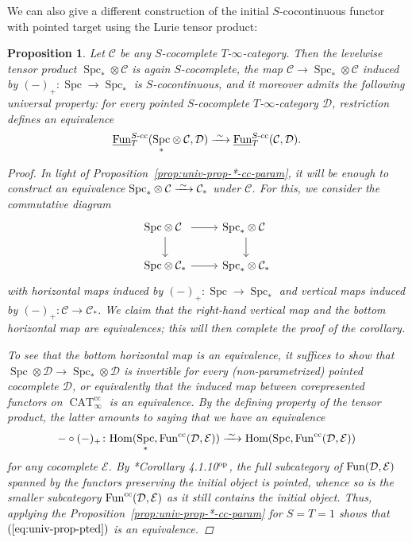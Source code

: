 \documentclass[reqno]{memo-l}
\theoremstyle{mythm}
\newtheorem{prop}[thm]{Proposition}
\theoremstyle{definition}
\numberwithin{equation}{section}
\newcommand{\Cc}{{\mathcal{C}}}
\newcommand{\Dd}{{\mathcal{D}}}
\newcommand{\Ee}{{\mathcal{E}}}
\DeclareMathOperator{\Spc}{Spc}
\DeclareMathOperator{\CAT}{CAT}
\renewcommand{\hom}{\textup{hom}}
\newcommand{\Fun}{{\textup{Fun}}}
\newcommand{\op}{{\textup{op}}}
\renewcommand{\hom}{{\textup{Hom}}}
\newcommand{\ulhelper}[2]{\underline{\setbox0=\hbox{$#1#2$}\dp0=0.4pt \box0\relax}}
\newcommand{\ul}[1]{{\mathpalette\ulhelper{#1}}\hbox{\rule[-2pt]{0pt}{0pt}}}
\newcommand{\iso}{\xrightarrow{\;\smash{\raisebox{-0.25ex}{\ensuremath{\scriptstyle\sim}}}\;}}
\begin{document}
We can also give a different construction of the initial $S$-cocontinuous functor with pointed target using the Lurie tensor product:

\begin{prop}\label{prop:Spc*-levelwise-tensor}
    Let $\Cc$ be any $S$-cocomplete $T$-$\infty$-category. Then the levelwise tensor product ${\Spc_*}\otimes\Cc$ is again $S$-cocomplete, the map $\Cc\to{\Spc_*}\otimes\Cc$ induced by $(-)_+\colon\Spc\to\Spc_*$ is $S$-cocontinuous, and it moreover admits the following universal property: for every pointed $S$-cocomplete $T$-$\infty$-category $\Dd$, restriction defines an equivalence
    \[
        \ul\Fun^\textup{$S$-cc}_T({\Spc_*}\otimes\Cc,\Dd)\iso\ul\Fun^\textup{$S$-cc}_T(\Cc,\Dd).
    \]
    \begin{proof}
        In light of Proposition~\ref{prop:univ-prop-*-cc-param}, it will be enough to construct an equivalence ${\Spc_*}\otimes\Cc\iso\Cc_*$ under $\Cc$. For this, we consider the commutative diagram
        \[
            \begin{tikzcd}
                {\Spc}\otimes\Cc_{\hphantom{*}}\arrow[d]\arrow[r] & {\Spc_*}\otimes\Cc_{\hphantom{*}}\arrow[d]\\
                {\Spc}\otimes\Cc_*\arrow[r] & {\Spc_*}\otimes\Cc_*
            \end{tikzcd}
        \]
        with horizontal maps induced by $(-)_+\colon\Spc\to\Spc_*$ and vertical maps induced by $(-)_+\colon\Cc\to\Cc_*$. We claim that the right-hand vertical map and the bottom horizontal map are equivalences; this will then complete the proof of the corollary.

        To see that the bottom horizontal map is an equivalence, it suffices to show that ${\Spc}\otimes\Dd\to{\Spc_*}\otimes\Dd$ is invertible for every (non-parametrized) pointed cocomplete $\Dd$, or equivalently that the induced map between corepresented functors on $\CAT_\infty^\text{cc}$ is an equivalence. By the defining property of the tensor product, the latter amounts to saying that we have an equivalence
        \begin{equation}\label{eq:univ-prop-pted}
            {-}\circ(-)_+\colon\hom(\Spc_*,\Fun^\text{cc}(\Dd,\Ee))\iso\hom(\Spc,\Fun^\text{cc}(\Dd,\Ee))
        \end{equation}
        for any cocomplete $\Ee$. By \cite{CLL_Global}*{Corollary 4.1.10${}^\op$}, the full subcategory of $\Fun(\Dd,\Ee)$ spanned by the functors preserving the initial object is pointed, whence so is the smaller subcategory $\Fun^\text{cc}(\Dd,\Ee)$ as it still contains the initial object. Thus, applying the Proposition~\ref{prop:univ-prop-*-cc-param} for $S=T=1$ shows that $(\ref{eq:univ-prop-pted})$ is an equivalence.


\end{proof}
\end{prop}
\end{document}
